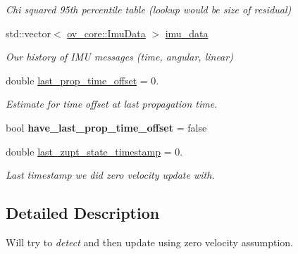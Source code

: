 \begin{DoxyCompactItemize}
\begin{DoxyCompactList}\small\item\em Chi squared 95th percentile table (lookup would be size of residual) \end{DoxyCompactList}\item 
\mbox{\label{classov__msckf_1_1UpdaterZeroVelocity_a38119874bfd080afe2f21444e7f26692}} 
std\+::vector$<$ \hyperlink{structov__core_1_1ImuData}{ov\+\_\+core\+::\+Imu\+Data} $>$ \hyperlink{classov__msckf_1_1UpdaterZeroVelocity_a38119874bfd080afe2f21444e7f26692}{imu\+\_\+data}
\begin{DoxyCompactList}\small\item\em Our history of I\+MU messages (time, angular, linear) \end{DoxyCompactList}\item 
\mbox{\label{classov__msckf_1_1UpdaterZeroVelocity_ae3d40558eff57d631724a15ab431f83a}} 
double \hyperlink{classov__msckf_1_1UpdaterZeroVelocity_ae3d40558eff57d631724a15ab431f83a}{last\+\_\+prop\+\_\+time\+\_\+offset} = 0.
\begin{DoxyCompactList}\small\item\em Estimate for time offset at last propagation time. \end{DoxyCompactList}\item 
\mbox{\label{classov__msckf_1_1UpdaterZeroVelocity_acf1718826a68f0bae6fe0bbd7d2654de}} 
bool {\bfseries have\+\_\+last\+\_\+prop\+\_\+time\+\_\+offset} = false
\item 
\mbox{\label{classov__msckf_1_1UpdaterZeroVelocity_a6b782fc825eddcd71a7808288cbb9734}} 
double \hyperlink{classov__msckf_1_1UpdaterZeroVelocity_a6b782fc825eddcd71a7808288cbb9734}{last\+\_\+zupt\+\_\+state\+\_\+timestamp} = 0.
\begin{DoxyCompactList}\small\item\em Last timestamp we did zero velocity update with. \end{DoxyCompactList}\end{DoxyCompactItemize}


\subsection{Detailed Description}
Will try to {\itshape detect} and then update using zero velocity assumption. 

